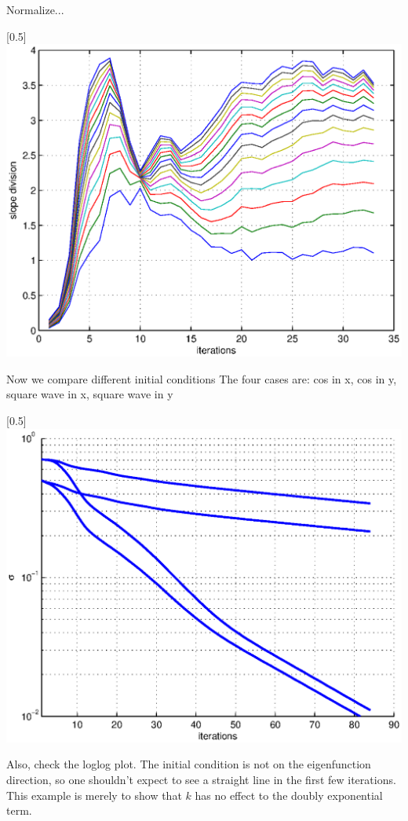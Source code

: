 Normalize...

\centerline{\scalebox{0.5}[0.5]{\includegraphics{standardmap_epsilon_0.2_slope_division.eps}}}


Now we compare different initial conditions
The four cases are: cos in x, cos in y, square wave in x, square wave in y

\centerline{\scalebox{0.5}[0.5]{\includegraphics{compareinitial.eps}}}

Also, check the loglog plot. The initial condition is not on the
eigenfunction direction, so one shouldn't expect to see a straight line
in the first few iterations. This example is merely to show that $k$
has no effect to the doubly exponential term.

